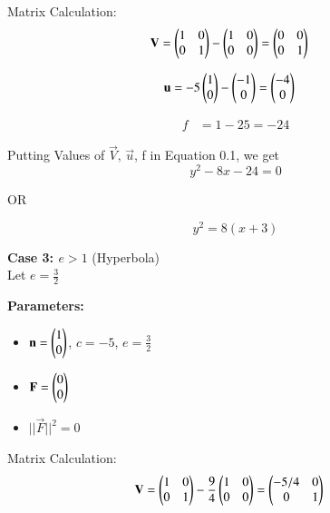 \documentclass[journal]{IEEEtran}
\begin{document}
\bigskip

Matrix Calculation:
\begin{align}
\mathbf{V} &= \begin{pmatrix}1 & 0 \\ 0 & 1\end{pmatrix} - \begin{pmatrix}1 & 0 \\ 0 & 0\end{pmatrix} = \begin{pmatrix}0 & 0 \\ 0 & 1\end{pmatrix}
\end{align}

\begin{align}
\mathbf{u} &= -5\begin{pmatrix}1 \\ 0\end{pmatrix} - \begin{pmatrix}-1 \\ 0\end{pmatrix} = \begin{pmatrix}-4 \\ 0\end{pmatrix}
\end{align}

\begin{align}
f &= 1 - 25 = -24
\end{align}

Putting Values of $\vec{V}, \, \vec{u}$, f in Equation 0.1, we get
\begin{equation}
y^2 - 8x - 24 = 0
\end{equation}

\begin{center}
    OR
\end{center}

\begin{equation}
\boxed{y^2 = 8(x + 3)}
\end{equation}

\newpage

\textbf{Case 3: $e > 1$} (Hyperbola)\\
Let $e = \frac{3}{2}$

\textbf{Parameters:}
\begin{itemize}
\item $\mathbf{n} = \begin{pmatrix}1 \\ 0\end{pmatrix}$, $c = -5$, $e = \frac{3}{2}$
\item $\mathbf{F} = \begin{pmatrix}0 \\ 0\end{pmatrix}$
\item $||\vec{F}||^2 = 0$
\end{itemize}

\bigskip

Matrix Calculation:
\begin{align}
\mathbf{V} &= \begin{pmatrix}1 & 0 \\ 0 & 1\end{pmatrix} - \frac{9}{4}\begin{pmatrix}1 & 0 \\ 0 & 0\end{pmatrix} = \begin{pmatrix}-5/4 & 0 \\ 0 & 1\end{pmatrix}
\end{align}
\end{document}
